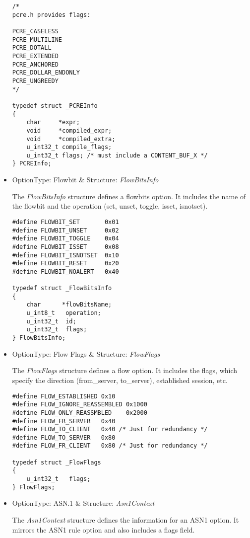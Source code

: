 \documentclass[english]{report}
\begin{document}
\begin{itemize}
\begin{verbatim}
/*
pcre.h provides flags:

PCRE_CASELESS
PCRE_MULTILINE
PCRE_DOTALL
PCRE_EXTENDED
PCRE_ANCHORED
PCRE_DOLLAR_ENDONLY
PCRE_UNGREEDY
*/

typedef struct _PCREInfo
{
    char     *expr;
    void     *compiled_expr;
    void     *compiled_extra;
    u_int32_t compile_flags;
    u_int32_t flags; /* must include a CONTENT_BUF_X */
} PCREInfo;
\end{verbatim}

\item {OptionType: Flowbit \& Structure: {\em FlowBitsInfo}}

The {\em FlowBitsInfo} structure defines a flowbits option.  It
includes the name of the flowbit and the operation (set, unset, toggle,
isset, isnotset).

\begin{verbatim}
#define FLOWBIT_SET       0x01
#define FLOWBIT_UNSET     0x02
#define FLOWBIT_TOGGLE    0x04
#define FLOWBIT_ISSET     0x08
#define FLOWBIT_ISNOTSET  0x10
#define FLOWBIT_RESET     0x20
#define FLOWBIT_NOALERT   0x40

typedef struct _FlowBitsInfo
{
    char      *flowBitsName;
    u_int8_t   operation;
    u_int32_t  id;
    u_int32_t  flags;
} FlowBitsInfo;
\end{verbatim}

\item {OptionType: Flow Flags \& Structure: {\em FlowFlags}}

The {\em FlowFlags} structure defines a flow option.  It includes
the flags, which specify the direction (from\_server, to\_server), 
established session, etc. 

\begin{verbatim}
#define FLOW_ESTABLISHED 0x10
#define FLOW_IGNORE_REASSEMBLED 0x1000
#define FLOW_ONLY_REASSMBLED    0x2000
#define FLOW_FR_SERVER   0x40
#define FLOW_TO_CLIENT   0x40 /* Just for redundancy */
#define FLOW_TO_SERVER   0x80
#define FLOW_FR_CLIENT   0x80 /* Just for redundancy */

typedef struct _FlowFlags
{
    u_int32_t   flags;
} FlowFlags;
\end{verbatim}

\item {OptionType: ASN.1 \& Structure: {\em Asn1Context}}

The {\em Asn1Context} structure defines the information for an
ASN1 option.  It mirrors the ASN1 rule option and also includes
a flags field.


\end{itemize}
\end{document}
